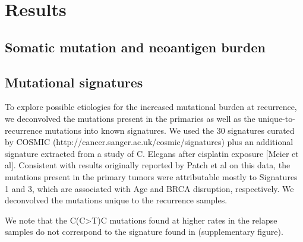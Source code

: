 \section*{Results}
\subsection*{Somatic mutation and neoantigen burden}



\subsection*{Mutational signatures}
To explore possible etiologies for the increased mutational burden at recurrence, we deconvolved the mutations present in the primaries as well as the unique-to-recurrence mutations into known signatures. We used the 30 signatures curated by COSMIC (http://cancer.sanger.ac.uk/cosmic/signatures) plus an additional signature extracted from a study of C. Elegans after cisplatin exposure [Meier et al]. Consistent with results originally reported by Patch et al on this data, the mutations present in the primary tumors were attributable mostly to Signatures 1 and 3, which are associated with Age and BRCA disruption, respectively. We deconvolved the mutations unique to the recurrence samples. 

We note that the C(C>T)C mutations found at higher rates in the relapse samples do not correspond to the signature found in  (supplementary figure).

